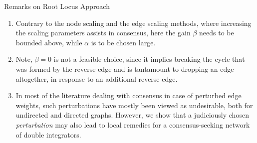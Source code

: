 \begin{subframe}{Remarks on Root Locus Approach}
	\begin{enumerate}
		\item Contrary to the node scaling and the edge scaling methods, where increasing the scaling parameters assists in consensus, here the gain $\beta$ needs to be bounded above, while $\alpha$ is to be chosen large.
		\item Note, $\beta=0$ is not a feasible choice, since it implies breaking the cycle that was formed by the reverse edge and is tantamount to dropping an edge altogether, in response to an additional reverse edge.
		\item In most of the literature dealing with consensus in case of perturbed edge weights, such perturbations have mostly been viewed as undesirable, both for undirected and directed graphs. However, we show that a judiciously chosen \emph{perturbation} may also lead to local remedies for a consensus-seeking network of double integrators.
	\end{enumerate} 
	\hyperlink{RLSim}{}~~\hyperlink{gersback}{}   
\end{subframe}


